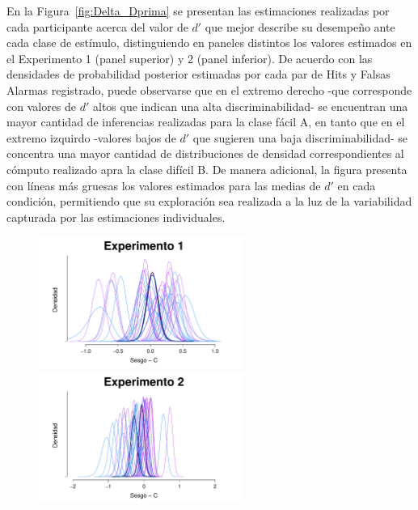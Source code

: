 En la Figura~\ref{fig:Delta_Dprima} se presentan las estimaciones realizadas por cada participante acerca del valor de $d'$ que mejor describe su desempeño ante cada clase de estímulo, distinguiendo en paneles distintos los valores estimados en el Experimento 1 (panel superior) y 2 (panel inferior). De acuerdo con las densidades de probabilidad posterior estimadas por cada par de Hits y Falsas Alarmas registrado, puede observarse que en el extremo derecho -que corresponde con valores de $d'$ altos que indican una alta discriminabilidad- se encuentran una mayor cantidad de inferencias realizadas para la clase fácil A, en tanto que en el extremo izquirdo -valores bajos de $d'$ que sugieren una baja discriminabilidad- se concentra una mayor cantidad de distribuciones de densidad correspondientes al cómputo realizado apra la clase difícil B. De manera adicional, la figura presenta con líneas más gruesas los valores estimados para las medias de $d'$ en cada condición, permitiendo que su exploración sea realizada a la luz de la variabilidad capturada por las estimaciones individuales.\\

\begin{figure}[th]
\centering
\includegraphics[width=0.6\textwidth]{Figures/MDelta_Cbias_E1}\\
\includegraphics[width=0.6\textwidth]{Figures/MDelta_Cbias_E2}\\
\caption[Modelo Delta: Distribuciones posteriores conjuntas para las medias de $d'$ y $c$ en cada clase de estímulo]{}
\label{fig:Delta_Cbias}
\end{figure}

